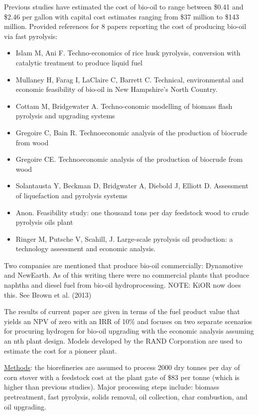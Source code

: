 \documentclass{article}\usepackage[]{graphicx}\usepackage[]{color}
\begin{document}
Previous studies have estimated the cost of bio-oil to range between \$0.41 and \$2.46 per gallon with capital cost estimates ranging from \$37 million to \$143 million.  Provided references for 8 papers reporting the cost of producing bio-oil via fast pyrolysis:
\begin{itemize}
\item Islam M, Ani F.  Techno-economics of rice husk pyrolysis, conversion with catalytic treatment to produce liquid fuel
\item Mullaney H, Farag I, LaClaire C, Barrett C.  Technical, environmental and economic feasibility of bio-oil in New Hampshire's North Country.
\item Cottam M, Bridgewater A.  Techno-conomic modelling of biomass flash pyrolysis and upgrading systems
\item Gregoire C, Bain R.  Technoeconomic analysis of the production of biocrude from wood
\item Gregoire CE.  Technoeconomic analysis of the production of biocrude from wood
\item Solantausta Y, Beckman D, Bridgwater A, Diebold J, Elliott D.  Assessment of liquefaction and pyrolysis systems
\item Anon.  Feasibility study: one thousand tons per day feedstock wood to crude pyrolysis oils plant
\item Ringer M, Putsche V, Scahill, J.  Large-scale pyrolysis oil production: a technology assessment and economic analysis.
\end{itemize}

Two companies are mentioned that produce bio-oil commercially: Dynamotive and NewEarth.  As of this writing there were no commercial plants that produce naphtha and diesel fuel from bio-oil hydroprocessing.  NOTE: KiOR now does this.  See Brown et al. (2013)

The results of current paper are given in terms of the fuel product value that yields an NPV of zero with an IRR of 10\% and focuses on two separate scenarios for procuring hydrogen for bio-oil upgrading with the economic analysis assuming an nth plant design.  Models developed by the RAND Corporation are used to estimate the cost for a pioneer plant.

\underline{Methods}:  the biorefineries are assumed to process 2000 dry tonnes per day of corn stover with a feedstock cost at the plant gate of \$83 per tonne (which is higher than previous studies).  Major processing steps include: biomass pretreatment, fast pyrolysis, solids removal, oil collection, char combustion, and oil upgrading.
\end{document}
